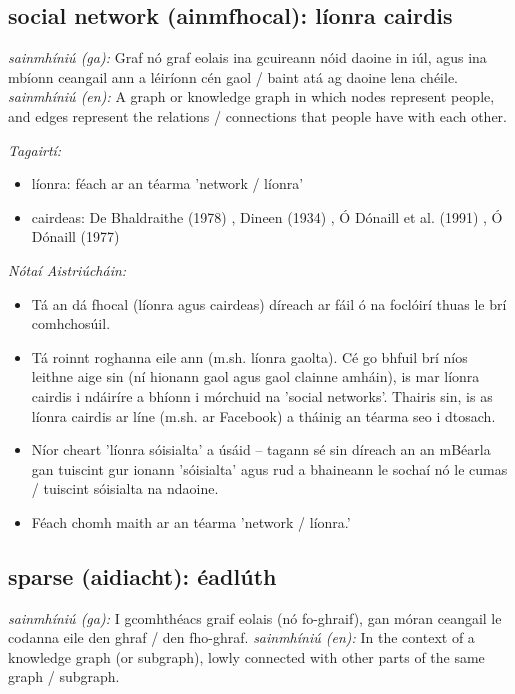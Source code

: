 \documentclass{article}
\begin{document}
\subsection*{social network (ainmfhocal): líonra cairdis} 
 \noindent \textit{sainmhíniú (ga):} Graf nó graf eolais ina gcuireann nóid daoine in iúl, agus ina mbíonn ceangail ann a léiríonn cén gaol / baint atá ag daoine lena chéile.
\newline\newline
 \noindent \textit{sainmhíniú (en):} A graph or knowledge graph in which nodes represent people, and edges represent the relations / connections that people have with each other.
\newline

 \noindent \textit{Tagairtí:}
\begin{itemize}
	\item líonra: féach ar an téarma 'network / líonra'
	\item cairdeas: De Bhaldraithe (1978) \cite{de-bhaldraithe}, Dineen (1934) \cite{dineen}, Ó Dónaill et al. (1991) \cite{focloir-beag}, Ó Dónaill (1977) \cite{odonaill}
\end{itemize}

 \noindent \textit{Nótaí Aistriúcháin:}
\begin{itemize}
	\item Tá an dá fhocal (líonra agus cairdeas) díreach ar fáil ó na foclóirí thuas le brí comhchosúil.
	\item Tá roinnt roghanna eile ann (m.sh. líonra gaolta). Cé go bhfuil brí níos leithne aige sin (ní hionann gaol agus gaol clainne amháin), is mar líonra cairdis i ndáiríre a bhíonn i mórchuid na 'social networks'. Thairis sin, is as líonra cairdis ar líne (m.sh. ar Facebook) a tháinig an téarma seo i dtosach.
	\item Níor cheart 'líonra sóisialta' a úsáid -- tagann sé sin díreach an an mBéarla gan tuiscint gur ionann 'sóisialta' agus rud a bhaineann le sochaí nó le cumas / tuiscint sóisialta na ndaoine.
	\item Féach chomh maith ar an téarma 'network / líonra.'
\end{itemize}


\subsection*{sparse (aidiacht): éadlúth} 
 \noindent \textit{sainmhíniú (ga):} I gcomhthéacs graif eolais (nó fo-ghraif), gan móran ceangail le codanna eile den ghraf / den fho-ghraf.
\newline\newline
 \noindent \textit{sainmhíniú (en):} In the context of a knowledge graph (or subgraph), lowly connected with other parts of the same graph / subgraph.
\newline
\end{document}
